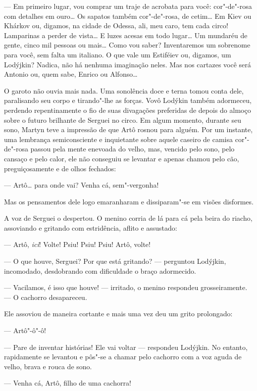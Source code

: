 --- Em primeiro lugar, vou comprar um traje de acrobata para você:
cor"-de"-rosa com detalhes em ouro\ldots{} Os sapatos também cor"-de"-rosa, de
cetim\ldots{} Em Kiev ou Khárkov ou, digamos, na cidade de Odessa, ali, meu
caro, tem cada circo! Lamparinas a perder de vista\ldots{} E luzes acesas em
todo lugar\ldots{} Um mundaréu de gente, cinco mil pessoas ou mais\ldots{} Como
vou saber? Inventaremos um sobrenome para você, sem falta um italiano. O
que vale um Estiféiev ou, digamos, um Lodýjkin? Nadica, não há nenhuma
imaginação neles. Mas nos cartazes você será Antonio ou, quem sabe,
Enrico ou Alfonso\ldots{}

O garoto não ouvia mais nada. Uma sonolência doce e terna tomou conta
dele, paralisando seu corpo e tirando"-lhe as forças. Vovô Lodýkin também
adormeceu, perdendo repentinamente o fio de suas divagações preferidas
de depois do almoço sobre o futuro brilhante de Serguei no circo. Em
algum momento, durante seu sono, Martyn teve a impressão de que Artô
rosnou para alguém. Por um instante, uma lembrança semiconsciente e
inquietante sobre aquele caseiro de camisa cor"-de"-rosa passou pela mente
enevoada do velho, mas, vencido pelo sono, pelo cansaço e pelo calor,
ele não conseguiu se levantar e apenas chamou pelo cão, preguiçosamente
e de olhos fechados:

--- Artô\ldots{} para onde vai? Venha cá, sem"-vergonha!

Mas os pensamentos dele logo emaranharam e dissiparam"-se em visões
disformes.

A voz de Serguei o despertou. O menino corria de lá para cá pela beira
do riacho, assoviando e gritando com estridência, aflito e assustado:

--- Artô, \emph{ici}! Volte! Psiu! Psiu! Psiu! Artô, volte!

--- O que houve, Serguei? Por que está gritando? --- perguntou Lodýjkin,
incomodado, desdobrando com dificuldade o braço adormecido.

--- Vacilamos, é isso que houve! --- irritado, o menino respondeu
grosseiramente. --- O cachorro desapareceu.

Ele assoviou de maneira cortante e mais uma vez deu um grito prolongado:

--- Artô"-ô"-ô!

--- Pare de inventar histórias! Ele vai voltar --- respondeu Lodýjkin.
No entanto, rapidamente se levantou e pôs"-se a chamar pelo cachorro com
a voz aguda de velho, brava e rouca de sono.

--- Venha cá, Artô, filho de uma cachorra!

